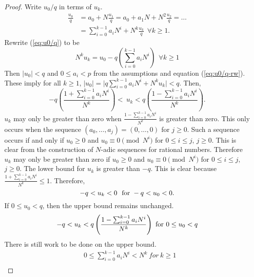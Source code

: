 \begin{proof}
  Write $u_0/q$ in terms of $u_k$.
  \begin{align}
    \frac{u_0}{q} &= a_0 + N\frac{u_1}{q}
                     = a_0 + a_1N + N^2\frac{u_2}{q}
                     = \dots \nonumber \\
                  &= \sum_{i=0}^{k-1}a_iN^i + N^k\frac{u_k}{q} \ \ 
                    \forall k \geq 1. \label{eq:u0/q}
  \end{align}
  Rewrite (\ref{eq:u0/q}) to be
  \begin{equation}\label{eq:u0/q-rw}
    N^ku_k=u_0-q\left(\sum_{i=0}^{k-1}a_iN^i\right) \ \ \forall k \geq 1
  \end{equation}
  Then $\lvert u_0 \rvert < q$ and $0 \leq a_i < p$ from the assumptions and
  equation (\ref{eq:u0/q-rw}). These imply for all $k \geq 1$,
  $\lvert u_0 \rvert = \lvert q\sum_{i=0}^{k-1}a_iN^i + N^ku_k \rvert < q$.
  Then,
  \begin{equation*}
    -q\left(\frac{1+\sum_{i=0}^{k-1}a_iN^i}{N^k}\right)
      < \ u_k
      < q\left(\frac{1-\sum_{i=0}^{k-1}a_iN^i}{N^k}\right).
  \end{equation*}
  $u_k$ may only be greater than zero when $\frac{1-\sum_{i=0}^{k-1}a_iN^i}
  {N^k}$ is greater than zero. This only occurs when the sequence
  $(a_0,\dots,a_j) = (0,\dots,0)$ for $j\geq0$. Such a sequence occurs if
  and only if $u_0\geq0$ and $u_0 \equiv 0 \pmod{N^i}$ for $0\leq i \leq j$,
  $j\geq0$. This is clear from the construction of $N$-adic sequences for
  rational numbers. Therefore $u_k$ may only be greater than zero if
  $u_0\geq0$ and $u_0 \equiv 0 \pmod{N^i}$ for $0\leq i \leq j$, $j\geq0$.
  The lower bound for $u_k$ is greater than $-q$. This is clear because
  $\frac{1+\sum_{i=0}^{k-1}a_iN^i}{N^k}\leq1$.
  Therefore,
  \begin{equation*}
    -q < u_k < 0 {\rm \ \ for \ } -q<u_0<0.
  \end{equation*}
  If $0\leq u_0<q$, then the upper bound remains unchanged.
  \begin{equation*}
    -q < u_k < q\left(\frac{1-\sum_{i=0}^{k-1}a_iN^i}{N^k}\right)
      \ {\rm for} \ 0\leq u_0 < q
  \end{equation*}
  There is still work to be done on the upper bound.
  \begin{align*}
                &0 \leq \sum_{i=0}^{k-1}a_iN^i < N^k \ for \ k\geq1 \\

\end{align*}
\end{proof}
